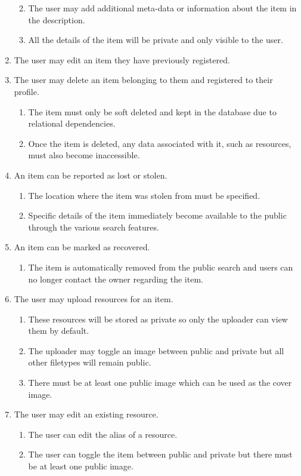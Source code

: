 \begin{enumerate}[label=\textbf{F\arabic*}]
\begin{enumerate}[leftmargin=0.75in]
		\item The user may add additional meta-data or information about the item in the description.
		\item All the details of the item will be private and only visible to the user.
	\end{enumerate}
\item The user may edit an item they have previously registered.
\item The user may delete an item belonging to them and registered to their profile.
	\begin{enumerate}[leftmargin=0.75in]
		\item The item must only be soft deleted and kept in the database due to relational dependencies.
		\item Once the item is deleted, any data associated with it, such as resources, must also become inaccessible.
	\end{enumerate}
\item An item can be reported as lost or stolen.
	\begin{enumerate}[leftmargin=0.75in]
		\item The location where the item was stolen from must be specified.
		\item Specific details of the item immediately become available to the public through the various search features.
	\end{enumerate}
\item An item can be marked as recovered.
	\begin{enumerate}[leftmargin=0.75in]
		\item The item is automatically removed from the public search and users can no longer contact the owner regarding the item.	
	\end{enumerate}
\item The user may upload resources for an item.
	\begin{enumerate}[leftmargin=0.75in]
		\item These resources will be stored as private so only the uploader can view them by default.
		\item The uploader may toggle an image between public and private but all other filetypes will remain public.	
		\item There must be at least one public image which can be used as the cover image.
	\end{enumerate}
\item The user may edit an existing resource.
	\begin{enumerate}[leftmargin=0.75in]
		\item The user can edit the alias of a resource.
		\item The user can toggle the item between public and private but there must be at least one public image.
	\end{enumerate}
	

\end{enumerate}
